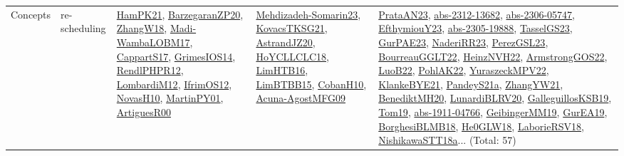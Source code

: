 {\begin{longtable}{lp{3cm}>{\raggedright}p{6cm}>{\raggedright}p{6cm}p{8cm}}
Concepts & re-scheduling & \href{articles/HamPK21.pdf}{HamPK21}\cite{HamPK21}, \href{papers/BarzegaranZP20.pdf}{BarzegaranZP20}\cite{BarzegaranZP20}, \href{articles/ZhangW18.pdf}{ZhangW18}\cite{ZhangW18}, \href{papers/Madi-WambaLOBM17.pdf}{Madi-WambaLOBM17}\cite{Madi-WambaLOBM17}, \href{papers/CappartS17.pdf}{CappartS17}\cite{CappartS17}, \href{articles/GrimesIOS14.pdf}{GrimesIOS14}\cite{GrimesIOS14}, \href{papers/RendlPHPR12.pdf}{RendlPHPR12}\cite{RendlPHPR12}, \href{articles/LombardiM12.pdf}{LombardiM12}\cite{LombardiM12}, \href{papers/IfrimOS12.pdf}{IfrimOS12}\cite{IfrimOS12}, \href{articles/NovasH10.pdf}{NovasH10}\cite{NovasH10}, \href{articles/MartinPY01.pdf}{MartinPY01}\cite{MartinPY01}, \href{articles/ArtiguesR00.pdf}{ArtiguesR00}\cite{ArtiguesR00} & \href{papers/Mehdizadeh-Somarin23.pdf}{Mehdizadeh-Somarin23}\cite{Mehdizadeh-Somarin23}, \href{papers/KovacsTKSG21.pdf}{KovacsTKSG21}\cite{KovacsTKSG21}, \href{articles/AstrandJZ20.pdf}{AstrandJZ20}\cite{AstrandJZ20}, \href{papers/HoYCLLCLC18.pdf}{HoYCLLCLC18}\cite{HoYCLLCLC18}, \href{papers/LimHTB16.pdf}{LimHTB16}\cite{LimHTB16}, \href{papers/LimBTBB15.pdf}{LimBTBB15}\cite{LimBTBB15}, \href{papers/CobanH10.pdf}{CobanH10}\cite{CobanH10}, \href{papers/Acuna-AgostMFG09.pdf}{Acuna-AgostMFG09}\cite{Acuna-AgostMFG09} & \href{articles/PrataAN23.pdf}{PrataAN23}\cite{PrataAN23}, \href{articles/abs-2312-13682.pdf}{abs-2312-13682}\cite{abs-2312-13682}, \href{articles/abs-2306-05747.pdf}{abs-2306-05747}\cite{abs-2306-05747}, \href{papers/EfthymiouY23.pdf}{EfthymiouY23}\cite{EfthymiouY23}, \href{articles/abs-2305-19888.pdf}{abs-2305-19888}\cite{abs-2305-19888}, \href{papers/TasselGS23.pdf}{TasselGS23}\cite{TasselGS23}, \href{articles/GurPAE23.pdf}{GurPAE23}\cite{GurPAE23}, \href{articles/NaderiRR23.pdf}{NaderiRR23}\cite{NaderiRR23}, \href{papers/PerezGSL23.pdf}{PerezGSL23}\cite{PerezGSL23}, \href{articles/BourreauGGLT22.pdf}{BourreauGGLT22}\cite{BourreauGGLT22}, \href{articles/HeinzNVH22.pdf}{HeinzNVH22}\cite{HeinzNVH22}, \href{papers/ArmstrongGOS22.pdf}{ArmstrongGOS22}\cite{ArmstrongGOS22}, \href{papers/LuoB22.pdf}{LuoB22}\cite{LuoB22}, \href{articles/PohlAK22.pdf}{PohlAK22}\cite{PohlAK22}, \href{articles/YuraszeckMPV22.pdf}{YuraszeckMPV22}\cite{YuraszeckMPV22}, \href{papers/KlankeBYE21.pdf}{KlankeBYE21}\cite{KlankeBYE21}, \href{articles/PandeyS21a.pdf}{PandeyS21a}\cite{PandeyS21a}, \href{articles/ZhangYW21.pdf}{ZhangYW21}\cite{ZhangYW21}, \href{articles/BenediktMH20.pdf}{BenediktMH20}\cite{BenediktMH20}, \href{articles/LunardiBLRV20.pdf}{LunardiBLRV20}\cite{LunardiBLRV20}, \href{papers/GalleguillosKSB19.pdf}{GalleguillosKSB19}\cite{GalleguillosKSB19}, \href{papers/Tom19.pdf}{Tom19}\cite{Tom19}, \href{articles/abs-1911-04766.pdf}{abs-1911-04766}\cite{abs-1911-04766}, \href{papers/GeibingerMM19.pdf}{GeibingerMM19}\cite{GeibingerMM19}, \href{articles/GurEA19.pdf}{GurEA19}\cite{GurEA19}, \href{articles/BorghesiBLMB18.pdf}{BorghesiBLMB18}\cite{BorghesiBLMB18}, \href{papers/He0GLW18.pdf}{He0GLW18}\cite{He0GLW18}, \href{articles/LaborieRSV18.pdf}{LaborieRSV18}\cite{LaborieRSV18}, \href{papers/NishikawaSTT18a.pdf}{NishikawaSTT18a}\cite{NishikawaSTT18a}... (Total: 57)\\

\end{longtable}}
